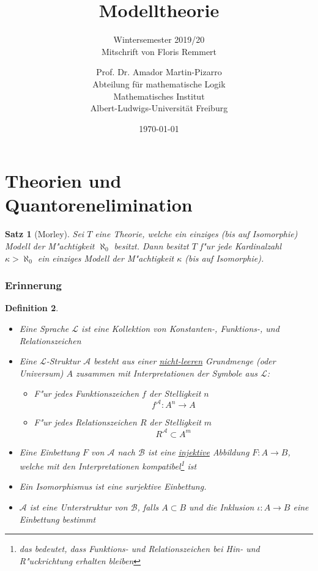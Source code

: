 \documentclass[a4paper,12pt,numbers=noenddot,parskip=full]{scrartcl}
\title{Modelltheorie}
\subtitle{Wintersemester 2019/20 \\ Mitschrift von Floris Remmert}
\author{Prof. Dr. Amador Martin-Pizarro\\Abteilung für mathematische Logik\\Mathematisches Institut\\Albert-Ludwigs-Universität Freiburg}
\date{\today}
\newcommand{\scrL}{\mathcal{L}}
\newcommand{\scrA}{\mathcal{A}}
\newcommand{\scrB}{\mathcal{B}}
\theoremstyle{dotless}
\newtheorem{theorem}{Satz}[section]
\newtheorem{definition}[theorem]{Definition}
\theoremstyle{remark}
\begin{document}
	\pagestyle{headings}
\begin{titlepage}
	\maketitle	
	\thispagestyle{empty}
\end{titlepage}
\newpage 
\thispagestyle{empty}
\quad 
\newpage
\tableofcontents 
\thispagestyle{empty}

\newpage
\setcounter{page}{1}
\part{Theorien und Quantorenelimination}

\begin{theorem}[Morley]
	Sei $T$ eine Theorie, welche ein einziges (bis auf Isomorphie) Modell der M"achtigkeit $\aleph_0$ besitzt. Dann besitzt $T$ f"ur jede Kardinalzahl $\kappa > \aleph_0$ ein einziges Modell der M"achtigkeit $\kappa$ (bis auf Isomorphie).
\end{theorem}

\section{Erinnerung}
\begin{definition}
	\begin{itemize}
		\item Eine Sprache $\scrL$ ist eine Kollektion von Konstanten-, Funktions-, und Relationszeichen
		\item Eine $\scrL$-Struktur $\scrA$ besteht aus einer \underline{nicht-leeren} Grundmenge (oder Universum) $A$ zusammen mit Interpretationen der Symbole aus $\scrL$:
		\begin{itemize}
			\item F"ur jedes Funktionszeichen $f$ der Stelligkeit $n$ 
			\begin{equation*}
				f^\scrA : A^n \longrightarrow A
			\end{equation*}
			\item F"ur jedes Relationszeichen $R$ der Stelligkeit $m$
			\begin{equation*}
				R^\scrA \subset A^m
			\end{equation*}
		\end{itemize}
	\item Eine Einbettung $F$ von $\scrA$ nach $\scrB$ ist eine \underline{injektive} Abbildung $F: A \longrightarrow B$, welche mit den Interpretationen kompatibel\footnote{das bedeutet, dass Funktions- und Relationszeichen bei Hin- und R"uckrichtung erhalten bleiben} ist
	\item Ein Isomorphismus ist eine surjektive Einbettung.
	\item $\scrA$ ist eine Unterstruktur von $\scrB$, falls $A \subset B$ und die Inklusion $\iota : A \longrightarrow B$ eine Einbettung bestimmt
	\end{itemize}
\end{definition}
\end{document}

